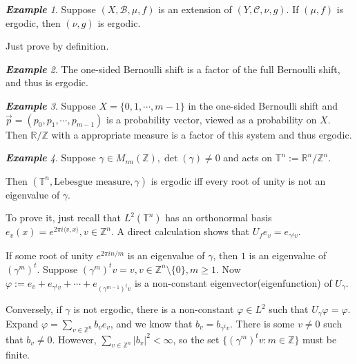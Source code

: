 \documentclass[10pt, a4paper, oneside]{report}
\numberwithin{equation}{chapter}
\theoremstyle{remark}
\theoremstyle{remark}
\newtheorem{example}{\bf{Example}}[chapter]
\begin{document}
\begin{example}
    Suppose $(X,\mathcal{B},\mu,f)$ is an extension of $(Y,\mathcal{C},\nu,g)$. If $(\mu,f)$ is ergodic, then $(\nu,g)$ is ergodic.


    Just prove by definition.
\end{example}

\begin{example}
    The one-sided Bernoulli shift is a factor of the full Bernoulli shift, and thus is ergodic.
\end{example}

\begin{example}
    Suppose $X=\{0,1,\cdots,m-1\}$ in the one-sided Bernoulli shift and $\vec{p}=(p_0,p_1,\cdots,p_{m-1})$ is a probability vector, viewed as a probability on $X$. Then $\mathbb{R}/\mathbb{Z}$ with a appropriate measure 
    is a factor of this system and thus ergodic.
\end{example}

\begin{example}
    Suppose $\gamma\in M_{nn}(\mathbb{Z}),\det(\gamma)\not=0$ and acts on $\mathbb{T}^n:=\mathbb{R}^n/\mathbb{Z}^n$.

    Then $(\mathbb{T}^n,\text{Lebesgue measure},\gamma)$ is ergodic iff every root of unity is not an eigenvalue of $\gamma$.

    To prove it, just recall that $L^2(\mathbb{T}^n)$ has an orthonormal basis $e_v(x)=e^{2\pi i\langle v,x\rangle},v\in\mathbb{Z}^n$. A direct calculation shows that $U_fe_v=e_{\gamma^tv}$.

    If some root of unity $e^{2\pi in/m}$ is an eigenvalue of $\gamma$, then $1$ is an eigenvalue of $(\gamma^m)^t$. Suppose $(\gamma^m)^tv=v,v\in\mathbb{Z}^n\setminus\{0\},m\geqslant 1$. Now $\varphi:=e_v+e_{\gamma^tv}+\cdots+e_{(\gamma^{m-1})^tv}$ is a non-constant eigenvector(eigenfunction) of $U_\gamma$.

    Conversely, if $\gamma$ is not ergodic, there is a non-constant $\varphi\in L^2$ such that $U_\gamma\varphi=\varphi$. Expand $\varphi=\sum\limits_{v\in\mathbb{Z}^n}b_ve_v$, and we know that $b_v=b_{\gamma^tv}$. There is some $v\not=0$ such that $b_v\not=0$.
    However, $\sum\limits_{v\in\mathbb{Z}^n}|b_v|^2<\infty$, so the set $\{(\gamma^m)^tv:m\in\mathbb{Z}\}$ must be finite.
\end{example}
\end{document}
